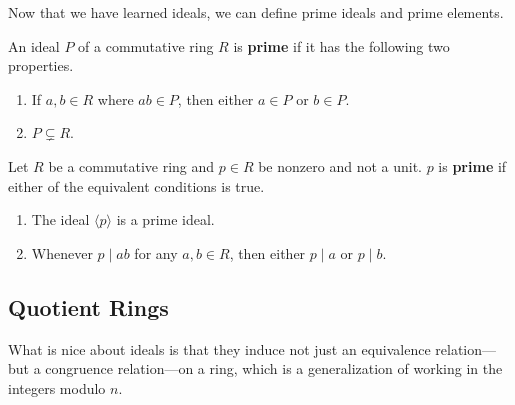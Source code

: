   Now that we have learned ideals, we can define prime ideals and prime elements. 
  
  \begin{definition}
    An ideal $P$ of a commutative ring $R$ is \textbf{prime} if it has the following two properties. 
    \begin{enumerate}
      \item If $a, b \in R$ where $ab \in P$, then either $a \in P$ or $b \in P$. 
      \item $P \subsetneq R$. 
    \end{enumerate}
  \end{definition}

  \begin{definition}
    Let $R$ be a commutative ring and $p \in R$ be nonzero and not a unit. $p$ is \textbf{prime} if either of the equivalent conditions is true. 
    \begin{enumerate}
      \item The ideal $\langle p \rangle$ is a prime ideal. 
      \item Whenever $p \mid ab$ for any $a, b \in R$, then either $p \mid a$ or $p \mid b$. 
    \end{enumerate}
  \end{definition}

\subsection{Quotient Rings}

  What is nice about ideals is that they induce not just an equivalence relation---but a congruence relation---on a ring, which is a generalization of working in the integers modulo $n$. 

